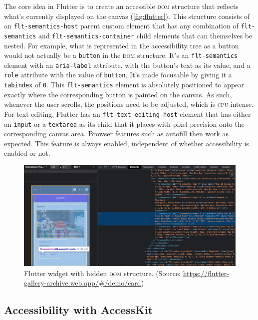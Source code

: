 \documentclass[sigconf]{acmart}
\begin{document}
 The core idea in Flutter is to create an accessible \textsc{dom} structure that reflects what's currently displayed on the canvas (\autoref{fig:flutter}). This structure consists of an \texttt{flt-semantics-host} parent custom element that has any combination of \texttt{flt-semantics} and \texttt{flt-semantics-container} child elements that can themselves be nested. For example, what is represented in the accessibility tree as a button would not actually be a \texttt{button} in the \textsc{dom} structure. It's an \texttt{flt-semantics} element with an \texttt{aria-label} attribute, with the button's text as its value, and a \texttt{role} attribute with the value of \texttt{button}. It's made focusable by giving it a \texttt{tabindex} of \texttt{0}. This \texttt{flt-semantics} element is absolutely positioned to appear exactly where the corresponding button is painted on the canvas. As such, whenever the user scrolls, the positions need to be adjusted, which is \textsc{cpu}-intense. For text editing, Flutter has an \texttt{flt-text-editing-host} element that has either an \texttt{input} or a \texttt{textarea} as its child that it places with pixel precision onto the corresponding canvas area. Browser features such as autofill then work as expected. This feature is always enabled, independent of whether accessibility is enabled or not.

\begin{figure}[h]
\includegraphics[width=\columnwidth]{flutter.png}
\caption{Flutter widget with hidden \textsc{dom} structure. (Source: \url{https://flutter-gallery-archive.web.app/#/demo/card})}
\label{fig:flutter}
\end{figure}

\subsection{Accessibility with AccessKit}
\end{document}
